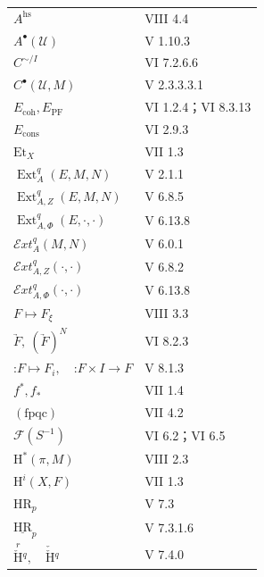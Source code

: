 \begin{longtable}{p{}p{}}
$A^{\mathrm{hs}}$ & VIII 4.4\\
$A^\bullet(\mathscr U)$ & V 1.10.3\\
$C^{\sim/I}$ & VI 7.2.6.6\\
$C^\bullet(\mathscr U,M)$ & V 2.3.3.3.1\\
$E_{\mathrm{coh}},E_{\mathrm{PF}}$ & VI 1.2.4；VI 8.3.13\\
$E_{\mathrm{cons}}$ & VI 2.9.3\\
$\mathrm{Et}_X$ & VII 1.3\\
$\operatorname{Ext}^q_A(E,M,N)$ & V 2.1.1\\
$\operatorname{Ext}^q_{A,Z}(E,M,N)$ & V 6.8.5\\
$\operatorname{Ext}^q_{A,\Phi}(E,\cdot,\cdot)$ & V 6.13.8\\
$\mathscr E\!xt_A^q(M,N)$ & V 6.0.1\\
$\mathscr E\!xt_{A,Z}^q(\cdot,\cdot)$ & V 6.8.2\\
$\mathscr E\!xt_{A,\Phi}^q(\cdot,\cdot)$ & V 6.13.8\\
$F\mapsto F_\xi$ & VIII 3.3\\
$\underrightarrow F,\ (\underrightarrow F)^N$ & VI 8.2.3\\
$\mathord{:}F\mapsto F_i,\quad\mathord{:}F\times I\to F$ & V 8.1.3\\
$f^*,f_*$ & VII 1.4\\
$(\mathrm{fpqc})$ & VII 4.2\\
$\mathscr F(S^{-1})$ & VI 6.2；VI 6.5\\
$\mathrm H^*(\pi,M)$ & VIII 2.3\\
$\mathrm H^i(X,F)$ & VII 1.3\\
$\mathrm{HR}_p$ & V 7.3\\
$\underline{\mathrm{HR}}_p$ & V 7.3.1.6\\
$\overset{r}{\check{\mathrm H}}{}^q,\quad\check{\check{\mathrm H}}{}^q$ & V 7.4.0\\
\end{longtable}
